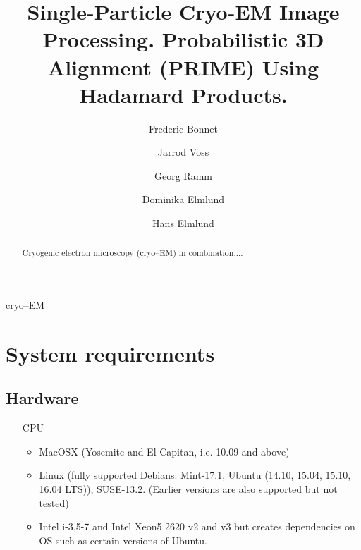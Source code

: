 \documentclass[review]{elsarticle}
\begin{document}
\begin{frontmatter}

\title{Single-Particle Cryo-EM Image Processing. Probabilistic 3D Alignment (PRIME) Using Hadamard Products.}

\author[MonashBio,ARCCentre]{Frederic Bonnet}
\author[MonashBio,ARCCentre]{Jarrod Voss}
\author[MonashBio,MonashMicro]{Georg Ramm}
\author[MonashBio,ARCCentre]{Dominika Elmlund}
\author[MonashBio,ARCCentre]{Hans Elmlund}
\address[MonashBio]{Department of Biochemistry Molecular Biology, Monash University, Clayton 3800, Australia}
\address[ARCCentre]{ARC Centre of Excellence for Advanced Molecular Imaging, Clayton 3800, Australia}
\address[MonashMicro]{Monash Micro Imaging, Clayton 3800, Victoria, Australia}

\begin{abstract}
Cryogenic electron microscopy (cryo--EM) in combination....
\end{abstract}

\begin{keyword}
cryo--EM
\end{keyword}

\end{frontmatter}

\linenumbers


\section{System requirements}
\label{sysreq}

\subsection{Hardware}
\label{hardware}

\begin{itemize}
\item [CPU]
  \begin{itemize}
  \item MacOSX (Yosemite and El Capitan, i.e. 10.09 and above)
  \item Linux (fully supported Debians: Mint-17.1, Ubuntu (14.10, 15.04,
    15.10, 16.04 LTS)), SUSE-13.2. (Earlier versions are also supported but
    not tested)
  \item Intel i-3,5-7 and Intel Xeon5 2620 v2 and v3 but creates
    dependencies on OS such as certain versions of Ubuntu.
  \end{itemize}
\end{itemize}
\end{document}
